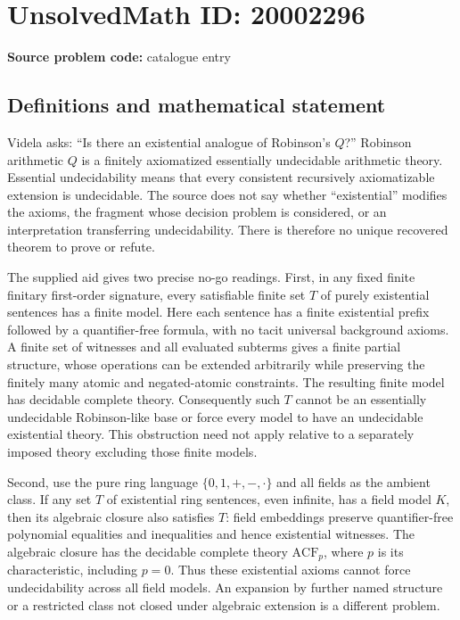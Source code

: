 \documentclass[11pt]{article}
\begin{document}
\section*{UnsolvedMath ID: 20002296}
\textbf{Source problem code:} catalogue entry
\subsection{Definitions and mathematical statement}
Videla asks: ``Is there an existential analogue of Robinson's \(Q\)?'' Robinson arithmetic \(Q\) is a finitely axiomatized essentially undecidable arithmetic theory. Essential undecidability means that every consistent recursively axiomatizable extension is undecidable. The source does not say whether ``existential'' modifies the axioms, the fragment whose decision problem is considered, or an interpretation transferring undecidability. There is therefore no unique recovered theorem to prove or refute.

The supplied aid gives two precise no-go readings. First, in any fixed finite finitary first-order signature, every satisfiable finite set \(T\) of purely existential sentences has a finite model. Here each sentence has a finite existential prefix followed by a quantifier-free formula, with no tacit universal background axioms. A finite set of witnesses and all evaluated subterms gives a finite partial structure, whose operations can be extended arbitrarily while preserving the finitely many atomic and negated-atomic constraints. The resulting finite model has decidable complete theory. Consequently such \(T\) cannot be an essentially undecidable Robinson-like base or force every model to have an undecidable existential theory. This obstruction need not apply relative to a separately imposed theory excluding those finite models.

Second, use the pure ring language \(\{0,1,+,-,\cdot\}\) and all fields as the ambient class. If any set \(T\) of existential ring sentences, even infinite, has a field model \(K\), then its algebraic closure also satisfies \(T\): field embeddings preserve quantifier-free polynomial equalities and inequalities and hence existential witnesses. The algebraic closure has the decidable complete theory \(\mathrm{ACF}_p\), where \(p\) is its characteristic, including \(p=0\). Thus these existential axioms cannot force undecidability across all field models. An expansion by further named structure or a restricted class not closed under algebraic extension is a different problem.
\end{document}
